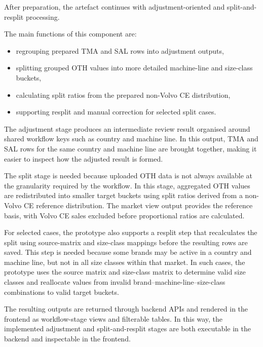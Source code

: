 After preparation, the artefact continues with adjustment-oriented and split-and-resplit processing.

The main functions of this component are:
\begin{itemize}
    \item regrouping prepared TMA and SAL rows into adjustment outputs,
    \item splitting grouped OTH values into more detailed machine-line and size-class buckets,
    \item calculating split ratios from the prepared non-Volvo CE distribution,
    \item supporting resplit and manual correction for selected split cases.
\end{itemize}

The adjustment stage produces an intermediate review result organised around shared workflow keys such as country and machine line. In this output, TMA and SAL rows for the same country and machine line are brought together, making it easier to inspect how the adjusted result is formed.

The split stage is needed because uploaded OTH data is not always available at the granularity required by the workflow. In this stage, aggregated OTH values are redistributed into smaller target buckets using split ratios derived from a non-Volvo CE reference distribution. The market view output provides the reference basis, with Volvo CE sales excluded before proportional ratios are calculated.

For selected cases, the prototype also supports a resplit step that recalculates the split using source-matrix and size-class mappings before the resulting rows are saved. This step is needed because some brands may be active in a country and machine line, but not in all size classes within that market. In such cases, the prototype uses the source matrix and size-class matrix to determine valid size classes and reallocate values from invalid brand--machine-line--size-class combinations to valid target buckets.

The resulting outputs are returned through backend APIs and rendered in the frontend as workflow-stage views and filterable tables. In this way, the implemented adjustment and split-and-resplit stages are both executable in the backend and inspectable in the frontend.
















